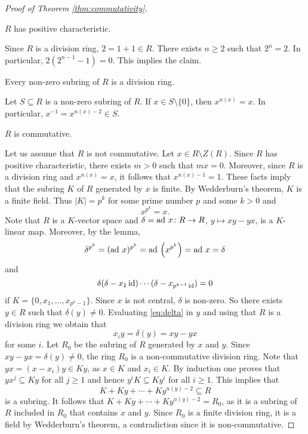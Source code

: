 \begin{proof}[Proof of Theorem \ref{thm:commutativity}]
    \begin{claim}
        $R$ has positive characteristic. 
    \end{claim}

    Since $R$ is a division ring, $2=1+1\in R$. There exists $n\geq2$ 
    such that $2^n=2$. In particular, 
    $2(2^{n-1}-1)=0$. This implies the claim. 
    
    \begin{claim}
        Every non-zero subring of $R$ is a division ring. 
    \end{claim}
    
    Let $S\subseteq R$ is a non-zero subring of $R$. If $x\in S\setminus\{0\}$, 
    then 
    $x^{n(x)}=x$. In particular, $x^{-1}=x^{n(x)-2}\in S$.
    
    \begin{claim}
        $R$ is commutative.
    \end{claim}
    
    Let us assume that $R$ is not commutative. Let $x\in R\setminus Z(R)$. 
    Since $R$ has positive characteristic, there exists $m>0$ such that 
    $mx=0$. Moreover, since $R$ is a division ring and 
    $x^{n(x)}=x$, it follows that $x^{n(x)-1}=1$. These facts imply that
    the subring $K$ of $R$ generated by
    $x$ is finite. By Wedderburn's theorem, $K$ is 
    a finite field. 
    Thus 
    $|K|=p^k$ for some prime number $p$ and some $k>0$ and 
    \[
    x^{p^k}=x.
    \]
    Note that $R$ is a $K$-vector space
    and $\delta=\operatorname{ad}\,x\colon R\to R$, $y\mapsto xy-yx$, is a $K$-linear map. Moreover, 
    by the lemma, 
    \[
    \delta^{p^k}=(\operatorname{ad}\,x)^{p^k}=\operatorname{ad}\,\left(x^{p^k}\right)=\operatorname{ad}\,x=\delta
    \]
    and 
    \begin{equation}
        \label{eq:delta}
        \delta(\delta-x_1\operatorname{id})\cdots (\delta-x_{p^{k-1}\operatorname{id}})=0
    \end{equation}
    if $K=\{0,x_1,\dots,x_{p^k-1}\}$. Since $x$ is not central, 
    $\delta$ is non-zero. So there exists $y\in R$ such that $\delta(y)\ne 0$. 
    Evaluating \eqref{eq:delta} in $y$ and using that $R$ is a division ring 
    we obtain that 
    \[
    x_iy=\delta(y)=xy-yx
    \]
    for some $i$. Let $R_0$ be the subring of $R$ generated by $x$ and $y$. 
    Since $xy-yx=\delta(y)\ne 0$, the ring $R_0$ is a 
    non-commutative division ring. Note that 
    $yx=(x-x_i)y\in Ky$, as $x\in K$ and $x_i\in K$. By induction one proves
    that $yx^j\subseteq Ky$ for all $j\geq 1$ and hence
    $y^iK\subseteq Ky^i$ for
    all $i\geq1$. This implies that
    \[
    K+Ky+\cdots+Ky^{n(y)-2}\subseteq R
    \]
    is a subring. It follows that $K+Ky+\cdots+Ky^{n(y)-2}=R_0$, 
    as it is a subring of $R$ included in $R_0$ 
    that contains $x$ and $y$. Since 
    $R_0$ is a finite division ring, it is a field 
    by Wedderburn's theorem, a contradiction since
    it is non-commutative.
\end{proof}

